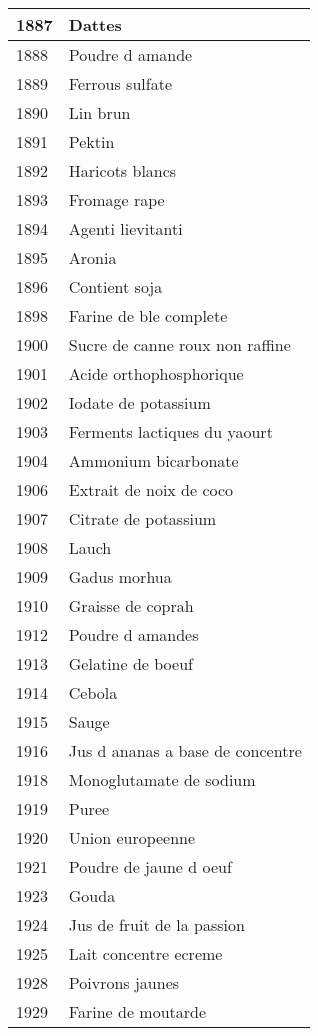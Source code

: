 \begin{longtable}{|l|l|}
1887 & Dattes \\ \hline 
1888 & Poudre d amande \\ \hline 
1889 & Ferrous sulfate \\ \hline 
1890 & Lin brun \\ \hline 
1891 & Pektin \\ \hline 
1892 & Haricots blancs \\ \hline 
1893 & Fromage rape \\ \hline 
1894 & Agenti lievitanti \\ \hline 
1895 & Aronia \\ \hline 
1896 & Contient soja \\ \hline 
1898 & Farine de ble complete \\ \hline 
1900 & Sucre de canne roux non raffine \\ \hline 
1901 & Acide orthophosphorique \\ \hline 
1902 & Iodate de potassium \\ \hline 
1903 & Ferments lactiques du yaourt \\ \hline 
1904 & Ammonium bicarbonate \\ \hline 
1906 & Extrait de noix de coco \\ \hline 
1907 & Citrate de potassium \\ \hline 
1908 & Lauch \\ \hline 
1909 & Gadus morhua \\ \hline 
1910 & Graisse de coprah \\ \hline 
1912 & Poudre d amandes \\ \hline 
1913 & Gelatine de boeuf \\ \hline 
1914 & Cebola \\ \hline 
1915 & Sauge \\ \hline 
1916 & Jus d ananas a base de concentre \\ \hline 
1918 & Monoglutamate de sodium \\ \hline 
1919 & Puree \\ \hline 
1920 & Union europeenne \\ \hline 
1921 & Poudre de jaune d oeuf \\ \hline 
1923 & Gouda \\ \hline 
1924 & Jus de fruit de la passion \\ \hline 
1925 & Lait concentre ecreme \\ \hline 
1928 & Poivrons jaunes \\ \hline 
1929 & Farine de moutarde \\ \hline 

\end{longtable}
